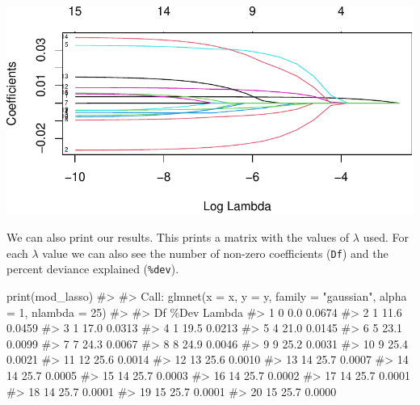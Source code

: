 \documentclass[
  letterpaper,
]{latex/krantz}
\makeatletter
\newenvironment{Shaded}{\begin{snugshade}}{\end{snugshade}}
\newcommand{\CommentTok}[1]{\textcolor[rgb]{0.37,0.37,0.37}{#1}}
\newcommand{\FunctionTok}[1]{\textcolor[rgb]{0.28,0.35,0.67}{#1}}
\newcommand{\NormalTok}[1]{\textcolor[rgb]{0.00,0.23,0.31}{#1}}
\newenvironment{kframe}{%
\medskip{}
\setlength{\fboxsep}{.8em}
 \def\at@end@of@kframe{}%
 \ifinner\ifhmode%
  \def\at@end@of@kframe{\end{minipage}}%
  \begin{minipage}{\columnwidth}%
 \fi\fi%
 \def\FrameCommand##1{\hskip\@totalleftmargin \hskip-\fboxsep
 \colorbox{shadecolor}{##1}\hskip-\fboxsep
     \hskip-\linewidth \hskip-\@totalleftmargin \hskip\columnwidth}%
 \MakeFramed {\advance\hsize-\width
   \@totalleftmargin\z@ \linewidth\hsize
   \@setminipage}}%
 {\par\unskip\endMakeFramed%
 \at@end@of@kframe}
\renewenvironment{Shaded}{\begin{kframe}}{\end{kframe}}
\makeatother
\begin{document}
\begin{center}
\includegraphics[width=1\textwidth,height=\textheight]{book/model_selection_files/figure-pdf/unnamed-chunk-6-1.pdf}
\end{center}

We can also print our results. This prints a matrix with the values of
\(\lambda\) used. For each \(\lambda\) value we can also see the number
of non-zero coefficients (\texttt{Df}) and the percent deviance
explained (\texttt{\%dev}).

\begin{Shaded}
\begin{Highlighting}[]
\FunctionTok{print}\NormalTok{(mod\_lasso)}
\CommentTok{\#\textgreater{} }
\CommentTok{\#\textgreater{} Call:  glmnet(x = x, y = y, family = "gaussian", alpha = 1, nlambda = 25) }
\CommentTok{\#\textgreater{} }
\CommentTok{\#\textgreater{}    Df \%Dev Lambda}
\CommentTok{\#\textgreater{} 1   0  0.0 0.0674}
\CommentTok{\#\textgreater{} 2   1 11.6 0.0459}
\CommentTok{\#\textgreater{} 3   1 17.0 0.0313}
\CommentTok{\#\textgreater{} 4   1 19.5 0.0213}
\CommentTok{\#\textgreater{} 5   4 21.0 0.0145}
\CommentTok{\#\textgreater{} 6   5 23.1 0.0099}
\CommentTok{\#\textgreater{} 7   7 24.3 0.0067}
\CommentTok{\#\textgreater{} 8   8 24.9 0.0046}
\CommentTok{\#\textgreater{} 9   9 25.2 0.0031}
\CommentTok{\#\textgreater{} 10  9 25.4 0.0021}
\CommentTok{\#\textgreater{} 11 12 25.6 0.0014}
\CommentTok{\#\textgreater{} 12 13 25.6 0.0010}
\CommentTok{\#\textgreater{} 13 14 25.7 0.0007}
\CommentTok{\#\textgreater{} 14 14 25.7 0.0005}
\CommentTok{\#\textgreater{} 15 14 25.7 0.0003}
\CommentTok{\#\textgreater{} 16 14 25.7 0.0002}
\CommentTok{\#\textgreater{} 17 14 25.7 0.0001}
\CommentTok{\#\textgreater{} 18 14 25.7 0.0001}
\CommentTok{\#\textgreater{} 19 15 25.7 0.0001}
\CommentTok{\#\textgreater{} 20 15 25.7 0.0000}
\end{Highlighting}
\end{Shaded}
\end{document}
